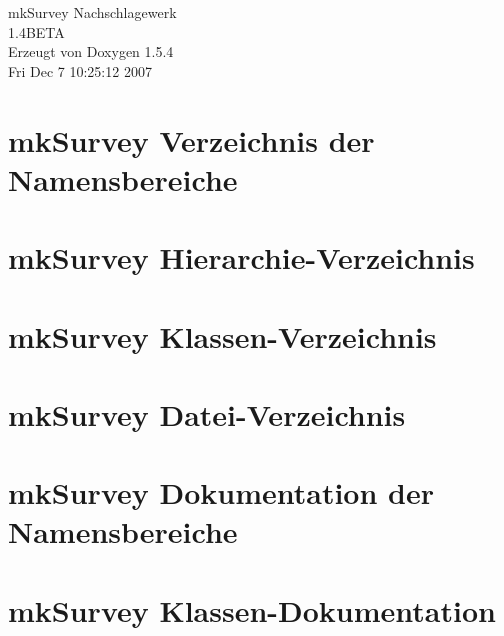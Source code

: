 \documentclass[a4paper]{book}
\begin{document}
\begin{titlepage}
\vspace*{7cm}
\begin{center}
{\Large mkSurvey Nachschlagewerk\\[1ex]\large 1.4BETA }\\
\vspace*{1cm}
{\large Erzeugt von Doxygen 1.5.4}\\
\vspace*{0.5cm}
{\small Fri Dec 7 10:25:12 2007}\\
\end{center}
\end{titlepage}
\clearemptydoublepage
{}
\tableofcontents
\clearemptydoublepage
{}
\chapter{mkSurvey Verzeichnis der Namensbereiche}

\chapter{mkSurvey Hierarchie-Verzeichnis}

\chapter{mkSurvey Klassen-Verzeichnis}

\chapter{mkSurvey Datei-Verzeichnis}

\chapter{mkSurvey Dokumentation der Namensbereiche}




\chapter{mkSurvey Klassen-Dokumentation}




































\end{document}
